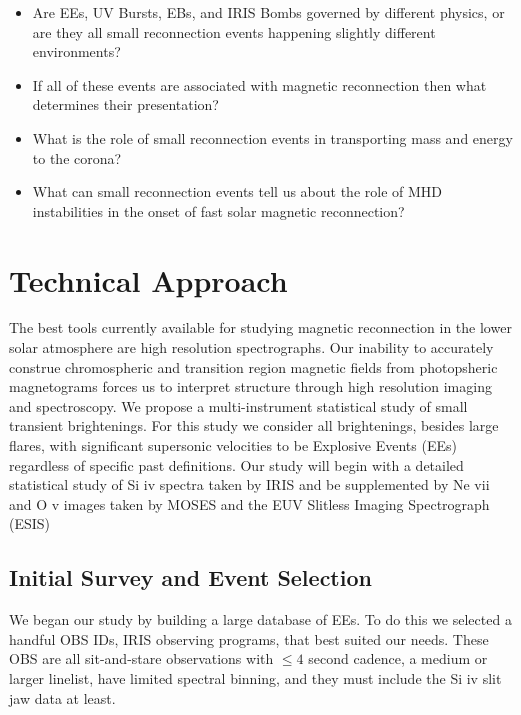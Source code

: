 \documentclass[]{aastex6}
\begin{document}
		\begin{itemize}
	
			\item Are EEs, UV Bursts, EBs, and IRIS Bombs governed by different physics, or are they all small reconnection events happening slightly different environments?
			\item If all of these events are associated with magnetic reconnection then what determines their presentation?
			\item What is the role of small reconnection events in transporting mass and energy to the corona?
			\item What can small reconnection events tell us about the role of MHD instabilities in the onset of fast solar magnetic reconnection?
			
			
		\end{itemize}
		


\section{Technical Approach} 

The best tools currently available for studying magnetic reconnection in the lower solar atmosphere are high resolution spectrographs.  Our inability to accurately construe chromospheric and transition region magnetic fields from photopsheric magnetograms forces us to interpret structure through high resolution imaging and spectroscopy.  We propose a multi-instrument statistical study of small transient brightenings.  For this study we consider all brightenings, besides large flares, with significant supersonic velocities to be Explosive Events (EEs) regardless of specific past definitions.  Our study will begin with a detailed statistical study of Si {\sc iv} spectra taken by IRIS and be supplemented by Ne {\sc vii} and O {\sc v} images taken by MOSES and the EUV Slitless Imaging Spectrograph (ESIS)

	\subsection{Initial Survey and Event Selection}
	We began our study by building a large database of EEs.  To do this we selected a handful OBS IDs, IRIS observing programs, that best suited our needs.  These OBS are all sit-and-stare observations with $\leq 4$ second cadence, a medium or larger linelist, have limited spectral binning, and they must include the Si {\sc iv} slit jaw data at least.   
	
\end{document}
